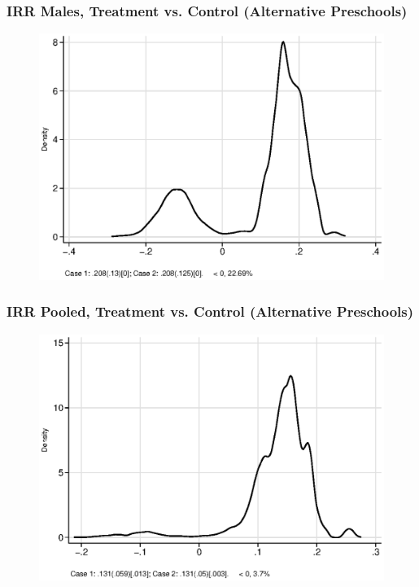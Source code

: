 \documentclass[static]{JJH-Beamer}
\begin{document}
\begin{frame}
\frametitle{IRR Males, Treatment vs. Control (Alternative Preschools)} 
\begin{figure}
	\includegraphics[width=.8\columnwidth]{output/irr_8_sexm.eps}
\end{figure}
\end{frame}


\begin{frame}
\frametitle{IRR Pooled, Treatment vs. Control (Alternative Preschools)} 
\begin{figure}
	\includegraphics[width=.8\columnwidth]{output/irr_8_sexp.eps}
\end{figure}
\end{frame}

\end{document}
